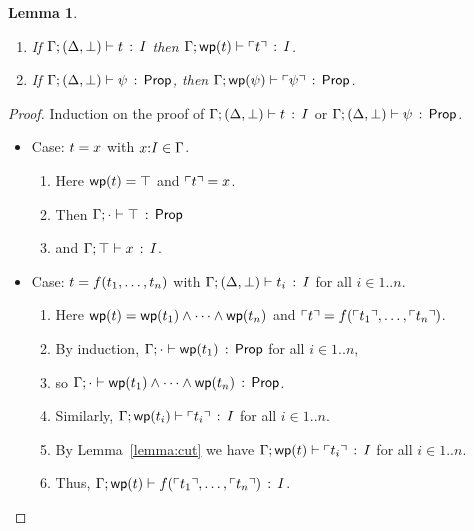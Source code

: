 \documentclass[10pt,a4paper]{article}
\newtheorem{lemma}[theorem]{Lemma}
\begin{document}
\clearpage

\begin{lemma}
\label{lemma:l9}
\mbox{}
  \begin{enumerate}
  \item If $\Gamma;(\Delta,\bot) \vdash t\, :\, I$ then
    $\Gamma;\mathop{\mathsf{wp}}(t) \vdash \ulcorner t \urcorner\, :\, I$.
  \item If $\Gamma;(\Delta,\bot) \vdash \psi\, :\, \mathsf{Prop}$, then
    $\Gamma;\mathop{\mathsf{wp}}(\psi) \vdash \ulcorner \psi \urcorner\, :\, \mathsf{Prop}$.
  \end{enumerate}
\end{lemma}

\begin{proof}
  \raggedright Induction on the proof of
  $\Gamma;(\Delta,\bot) \vdash t\, :\, I$ or $\Gamma;(\Delta,\bot) \vdash \psi\, :\, \mathsf{Prop}$.
  \begin{itemize}
  \item Case: $t = x$ with $x{:}I\in\Gamma$.  
    \begin{enumerate}
      \item
        Here $\mathop{\mathsf{wp}}(t) = \top$ and $\ulcorner t \urcorner = x$.
      \item
        Then $\Gamma;\cdot \vdash \top\, :\, \mathsf{Prop}$ 
      \item
        and $\Gamma;\top \vdash x\, :\, I$.
      \end{enumerate}
  \item Case: $t = f({t}_1,\ldots,{t}_{n})$ with
    $\Gamma;(\Delta,\bot) \vdash t_i\, :\, I$ for all $i\in1..n$.
    \begin{enumerate}
    \item
      Here $\mathop{\mathsf{wp}}(t) =
      \mathop{\mathsf{wp}}(t_1) \wedge \cdots \wedge \mathop{\mathsf{wp}}(t_n)$
      and $\ulcorner t \urcorner = f(\ulcorner t_1 \urcorner,\ldots,\ulcorner t_n \urcorner)$.
    \item 
    	By induction,
      $\Gamma;\cdot \vdash \mathop{\mathsf{wp}}(t_1)\, :\, \mathsf{Prop}$ for
      all $i\in1..n$, 
    \item 
    	so
    $\Gamma;\cdot \vdash \mathop{\mathsf{wp}}(t_1) \wedge \cdots \wedge \mathop{\mathsf{wp}}(t_n)\, :\, \mathsf{Prop}$.
    \item 
    Similarly, $\Gamma;\mathop{\mathsf{wp}}(t_i) \vdash \ulcorner t_i \urcorner\, :\, I$ for
      all $i\in1..n$.  
    \item
      By Lemma~\ref{lemma:cut} we have
      $\Gamma;\mathop{\mathsf{wp}}(t) \vdash \ulcorner t_i \urcorner\, :\, I$ for
      all $i\in1..n$.  
    \item Thus,
      $\Gamma;\mathop{\mathsf{wp}}(t) \vdash f(\ulcorner t_1 \urcorner,\ldots,\ulcorner t_n \urcorner)\, :\, I$.  
    \end{enumerate}
    
  \goodbreak
    

\end{itemize}
\end{proof}
\end{document}
